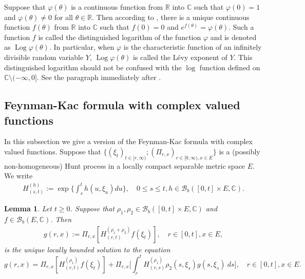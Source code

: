 \documentclass[12pt,a4paper]{amsart}
\theoremstyle{plain}
\newtheorem{lem}[thm]{Lemma}
\theoremstyle{definition}
\numberwithin{equation}{section}
\begin{document}
Suppose that $\varphi(\theta)$ is a continuous function from $\mathbb R$ into $\mathbb C$ such that $\varphi(0) = 1$ and $\varphi(\theta) \neq 0$ for all $\theta \in \mathbb R$.
Then according to \cite[Lemma 7.6]{Sato2013Levy}, there is a unique continuous function $f(\theta)$ from $\mathbb R$ into $\mathbb C$ such that $f(0) = 0$ and $e^{f(\theta)} = \varphi(\theta)$.
Such a function $f$ is called the distinguished logarithm of the function $\varphi$ and is denoted as $\operatorname{Log} \varphi(\theta)$.
In particular, when $\varphi$ is the characteristic function of an infinitely divisible random variable $Y$,  $\operatorname{Log} \varphi(\theta)$ is called the L\'evy exponent of $Y$.
This distinguished logarithm should not be confused with the $\log$ function defined on $\mathbb C\setminus (-\infty, 0]$.
See the paragraph immediately after \cite[Lemma 7.6]{Sato2013Levy}.

\subsection{Feynman-Kac formula with complex valued functions}
\label{seq: complex Feynman-Kac transform}
In this subsection we give a version of the Feynman-Kac formula with complex valued functions.
Suppose that $\{(\xi_t)_{t \in [r,\infty)}; (\Pi_{r,x})_{r\in [0,\infty), x\in E}\}$ is a (possibly non-homogeneous) Hunt process in a locally compact separable metric space $E$.
We write
\begin{align}
  H^{(h)}_{(s,t)}
  := \exp\Big\{\int_s^t h(u,\xi_u) du\Big\},
  \quad 0 \leq s \leq t, h \in \mathcal B_b([0,t] \times E,\mathbb C).
\end{align}

\begin{lem}
  \label{eq: complex FK}
  Let $t \geq 0$. Suppose that $\rho_1, \rho_2\in \mathcal B_b([0,t] \times E, \mathbb C)$ and $f\in \mathcal B_b(E, \mathbb C)$.
  Then
  \begin{align}
    \label{eq: expresion of g}
    g(r,x)
    := \Pi_{r,x}[ H_{(r,t)}^{(\rho_1+\rho_2)} f(\xi_t)],\quad r \in [0,t], x\in E,
  \end{align}
  is the unique locally bounded solution to the equation
  \[
    g(r,x)
    = \Pi_{r,x} [ H_{(r,t)}^{(\rho_1)} f(\xi_t)]+\Pi_{r,x} \Big[ \int_r^tH_{(r,s)}^{(\rho_1)}\rho_2(s,\xi_s) g(s,\xi_s)~ds \Big],\quad r \in [0,t], x\in E.
  \]
\end{lem}
\end{document}
